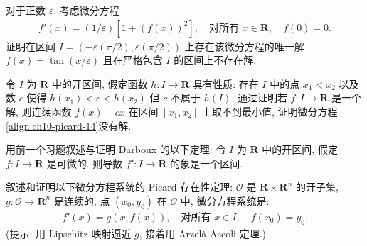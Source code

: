 \documentclass[../../main.tex]{subfiles}
\begin{document}
\begin{exercise}\label{exercise:ch10-41}
对于正数 $\varepsilon$, 考虑微分方程
\begin{align*}
f'(x)=(1/\varepsilon)[1+(f(x))^{2}],\quad\text{对所有 }x\in\mathbf{R},\quad f(0)=0.
\end{align*}
证明在区间 $I=(-\varepsilon(\pi/2),\varepsilon(\pi/2))$ 上存在该微分方程的唯一解 $f(x)=\tan(x/\varepsilon)$ 且在严格包含 $I$ 的区间上不存在解.
\end{exercise}

\begin{exercise}\label{exercise:ch10-42}
令 $I$ 为 $\mathbf{R}$ 中的开区间, 假定函数 $h:I\to\mathbf{R}$ 具有性质: 存在 $I$ 中的点 $x_{1}<x_{2}$ 以及数 $c$ 使得 $h(x_{1})<c<h(x_{2})$ 但 $c$ 不属于 $h(I)$. 通过证明若 $f:I\to\mathbf{R}$ 是一个解, 则连续函数 $f(x)-cx$ 在区间 $[x_{1},x_{2}]$ 上取不到最小值, 证明微分方程\eqref{align:ch10-picard-14}没有解.
\end{exercise}

\begin{exercise}\label{exercise:ch10-43}
用前一个习题叙述与证明 Darboux 的以下定理: 令 $I$ 为 $\mathbf{R}$ 中的开区间, 假定 $f:I\to\mathbf{R}$ 是可微的. 则导数 $f':I\to\mathbf{R}$ 的象是一个区间.
\end{exercise}

\begin{exercise}\label{exercise:ch10-44}
叙述和证明以下微分方程系统的 Picard 存在性定理: $\mathcal{O}$ 是 $\mathbf{R}\times\mathbf{R}^{n}$ 的开子集, $g:\mathcal{O}\to\mathbf{R}^{n}$ 是连续的, 点 $(x_{0},y_{0})$ 在 $\mathcal{O}$ 中, 微分方程系统是:
\begin{align*}
f'(x)=g(x,f(x)),\quad\text{对所有 }x\in I,\quad f(x_{0})=y_{0}.
\end{align*}
(提示: 用 Lipschitz 映射逼近 $g$, 接着用 Arzel\`a-Ascoli 定理.)
\end{exercise}
\end{document}
